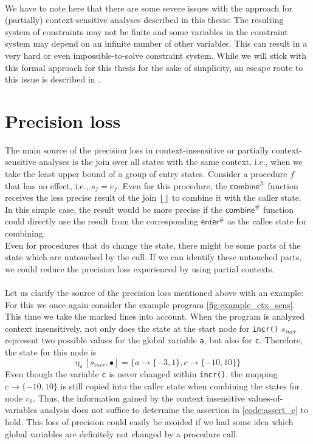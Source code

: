     \\
    We have to note here that there are some severe issues with the approach for (partially) context-sensitive analyses described in this thesis: The resulting system of constraints may not be finite and some variables in the constraint system may depend on an infinite number of other variables. This can result in a very hard or even impossible-to-solve constraint system. While we will stick with this formal approach for this thesis for the sake of simplicity, an escape route to this issue is described in \parencite{apinis2012side}.

  \section{Precision loss}\label{sec:precisionLoss}
    The main source of the precision loss in context-insensitive or partially context-sensitive analyses is the join over all states with the same context, i.e., when we take the least upper bound of a group of entry states. Consider a procedure $f$ that has no effect, i.e., $s_f = e_f$. Even for this procedure, the $\textsf{combine}^{\#}$ function receives the less precise result of the join $\bigsqcup$ to combine it with the caller state. In this simple case, the result would be more precise if the $\textsf{combine}^{\#}$ function could directly use the result from the corresponding $\textsf{enter}^{\#}$ as the callee state for combining.\\
    Even for procedures that do change the state, there might be some parts of the state which are untouched by the call. If we can identify these untouched parts, we could reduce the precision loss experienced by using partial contexts.\\
    \\
    Let us clarify the source of the precision loss mentioned above with an example: For this we once again consider the example program \autoref{fig:example_ctx_sens}. This time we take the marked lines into account. When the program is analyzed context insensitively, not only does the state at the start node for \texttt{incr()} $s_{incr}$ represent two possible values for the global variable \texttt{a}, but also for \texttt{c}. Therefore, the state for this node is
    \[\eta_\textsf{v}\ [s_{incr}, \bullet] = \{a \rightarrow \{-3, 1\}, c \rightarrow \{-10, 10\}\} \]
    Even though the variable \texttt{c} is never changed within \texttt{incr()}, the mapping $c \rightarrow \{-10, 10\}$ is still copied into the caller state when combining the states for node $v_6$. Thus, the information gained by the context insensitive values-of-variables analysis does not suffice to determine the assertion in \autoref{code:assert_c} to hold. This loss of precision could easily be avoided if we had some idea which global variables are definitely not changed by a procedure call.


